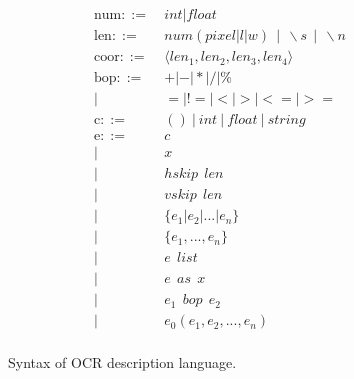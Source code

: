 
\begin{figure}[!ht]
\begin{minipage}{0.8\columnwidth}
\begin{align*}
\text{num} ::=~& int|float\\
\text{len} ::=~& num  (pixel|l|w) ~~ | ~~ \backslash s ~~ | ~~ \backslash n\\
\text{coor} ::=~& \langle len_1, len_2, len_3, len_4\rangle\\
\text{bop} ::=
~& +|-|*|/|\%\\
|~&=|!=|<|>|<=|>=\\
\text{c} ::=~& ()~ |~ int~ |~ float~ |~ string \\
\text{e} ::=
~& c \tag{constant}\label{syntax:constant}\\
|~& x \tag{variable}\label{syntax:name}\\
|~& hskip ~~len \tag{horizontal skip}\label{syntax:hskip}\\
|~& vskip ~~len \tag{vertical skip}\label{syntax:vskip}\\
|~& \{e_1 | e_2 | ... | e_n\} \tag{union}\label{syntax:union}\\
|~& \{e_1, ..., e_n\} \tag{struct}\label{syntax:struct}\\
|~& e ~~ list \tag{list}\label{syntax:list}\\
|~& e ~~ as ~~ x \tag{binding}\label{syntax:binding}\\
|~& e_1 ~~ bop ~~ e_2 \tag{binary operation}\label{syntax:bop}\\
|~& e_0(e_1, e_2, ..., e_n) \tag{constraint} \label{syntax:constraints}\\
\end{align*}
\end{minipage}
\caption{Syntax of OCR description language.}
\label{fig:syntax}

\end{figure}

